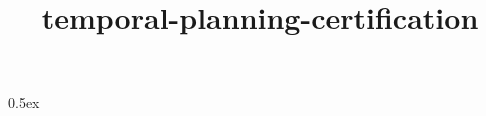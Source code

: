 \documentclass[11pt,a4paper]{article}
\begin{document}
\title{temporal-planning-certification}
\maketitle

\tableofcontents

\parindent 0pt\parskip 0.5ex




\nocite{*}

\end{document}
